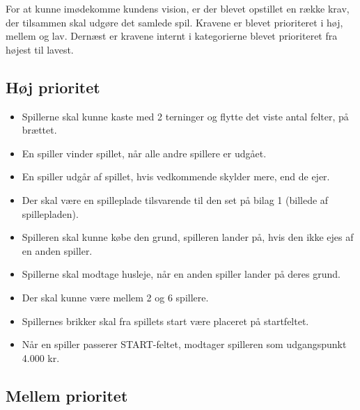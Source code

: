 For at kunne imødekomme kundens vision, er der blevet opstillet en række krav, der tilsammen skal udgøre det samlede spil. Kravene er blevet prioriteret i høj, mellem og lav. Dernæst er kravene internt i kategorierne blevet prioriteret fra højest til lavest. 


\subsection{Høj prioritet}

\begin{itemize}
    \item Spillerne skal kunne kaste med 2 terninger og flytte det viste antal felter, på brættet.
    \item En spiller vinder spillet, når alle andre spillere er udgået.
    \item En spiller udgår af spillet, hvis vedkommende skylder mere, end de ejer.
    \item Der skal være en spilleplade tilsvarende til den set på bilag 1 (billede af spillepladen).
    \item Spilleren skal kunne købe den grund, spilleren lander på, hvis den ikke ejes af en anden spiller.
    \item Spillerne skal modtage husleje, når en anden spiller lander på deres grund.
    \item Der skal kunne være mellem 2 og 6 spillere.
    \item Spillernes brikker skal fra spillets start være placeret på startfeltet.
    \item Når en spiller passerer START-feltet, modtager spilleren som udgangspunkt 4.000 kr.
\end{itemize}

\subsection{Mellem prioritet}


